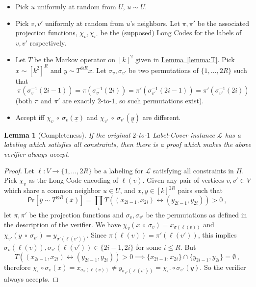 \documentclass[10pt]{article}
\newtheorem{lemma}[theorem]{Lemma}
\theoremstyle{definition}
\numberwithin{equation}{section}
\newcommand{\expref}[2]{\texorpdfstring{\hyperref[#2]{#1~\ref{#2}}}{#1~\ref{#2}}}
\newcommand{\prob}[2]{\mathsf{Pr}_{#1}\left[#2\right]}
\newcommand{\dtoone}[1]{{\sf ${#1}$-to-$1$}}
\newcommand{\xiffy}[2]{\ensuremath{{#1} \mathcal{\leftrightarrow} {#2}}}
\newcommand{\intset}[1]{\ensuremath{\{1,\ldots,{#1}\}}}
\renewcommand{\le}{\leqslant}
\begin{document}
\begin{itemize}
\vspace{-1ex}
\itemsep=0ex
\item Pick $u$ uniformly at random from $U$, $u\sim U$.
\item Pick $v,v'$ uniformly at random from $u$'s neighbors. Let $\pi,
  \pi'$ be the associated projection functions, $\chi_v, \chi_{v'}$ be
  the (supposed) Long Codes for the labels of $v, v'$ respectively.
\item Let $T$ be the Markov operator on $[k]^2$ given in \expref{Lemma}{lemma:T}. Pick $x \sim [k^2]^R$ and $y \sim T^{\otimes R}
  x$. Let $\sigma_v,\sigma_{v'}$ be two permutations of $\intset{2 R}$ such
  that \[\pi(\sigma^{-1}_v(2i-1)) = \pi(\sigma^{-1}_v(2i)) =
  \pi'(\sigma_{v'}^{-1}(2i-1)) = \pi'(\sigma_{v'}^{-1}(2i))\] (both $\pi$ and
  $\pi'$ are exactly \dtoone{2}, so such permutations exist).
\item Accept iff $\chi_v\ \circ\ \sigma_v (\underline{x}) $ and
  $\chi_{v'} \ \circ\ \sigma_{v'}(\underline{y})$ are different.
\end{itemize}
%
%
%
\begin{lemma}[Completeness]
\label{lem:kcol-compl}
  If the original \dtoone{2} Label-Cover instance $\mathcal{L}$ has a
  labeling which satisfies all constraints, then there is a proof
  which makes the above verifier always accept.
\end{lemma}
%
\begin{proof}
  Let $\ell:V\to \intset{2 R}$ be a labeling for $\mathcal{L}$
  satisfying all constraints in $\Pi$. Pick $\chi_v$ as the Long Code
  encoding of $\ell(v)$. Given any pair of vertices $v,v' \in V$ which
  share a common neighbor $u \in U$, and $x,y\in [k]^{2 R}$ pairs such
  that 
\[ \prob{}{\overline{y} \sim T^{\otimes R}(\overline{x})} = \prod_i
  T(\xiffy{(x_{2i-1},x_{2i})}{(y_{2i-1},y_{2i})})>0 \ , \]
%
 let $\pi,\pi'$
  be the projection functions and $\sigma_v,\sigma_{v'}$ be the permutations
  as defined in the description of the verifier. We have $\chi_v(x \ \circ\ \sigma_v) =
  x_{\sigma(\ell(v))}$ and $\chi_{v'}(y \ \circ\ \sigma_{v'}) =
  y_{\sigma'(\ell(v'))}$. Since $\pi(\ell(v)) = \pi'(\ell(v'))$, this
  implies $\sigma_v(\ell(v)),\sigma_{v'}(\ell(v')) \in \{2i-1,2i\}$ for some
  $i\le R$. But 
\[ T(\xiffy{(x_{2i-1},x_{2i})}{(y_{2i-1},y_{2i})})>0
  \implies \{x_{2i-1},x_{2i}\}\cap \{y_{2i-1},y_{2i}\}=\emptyset \ , \]
%
  therefore $\chi_{v}\circ \sigma_v(x) = x_{\sigma_v(\ell(v))} \neq
  y_{\sigma_{v'}(\ell(v'))}=\chi_{v'}\circ \sigma_{v'}(y)$. So the verifier always accepts.
\end{proof}
\end{document}

